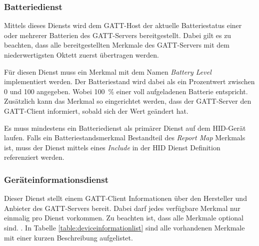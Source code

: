 \subsubsection{Batteriedienst}
Mittels dieses Diensts wird dem \acs{GATT}-Host der aktuelle Batteriestatus einer oder mehrerer Batterien des \acs{GATT}-Servers bereitgestellt. Dabei gilt es zu beachten, dass alle bereitgestellten Merkmale des \acs{GATT}-Servers mit dem niederwertigsten Oktett zuerst übertragen werden. \cite[S.~6]{bluetoothBatteryS}

Für diesen Dienst muss ein Merkmal mit dem Namen \textit{Battery Level} implementiert werden. Der Batteriestand wird dabei als ein Prozentwert zwischen 0 und 100 angegeben. Wobei 100~\% einer voll aufgeladenen Batterie entspricht. Zusätzlich kann das Merkmal so eingerichtet werden, dass der \acs{GATT}-Server den \acs{GATT}-Client informiert, sobald sich der Wert geändert hat. \cite[S.~8]{bluetoothBatteryS}

Es muss mindestens ein Batteriedienst als primärer Dienst auf dem \acs{HID}-Gerät laufen. Falls ein Batteriestandsmerkmal Bestandteil des \textit{Report Map} Merkmals ist, muss der Dienst mittels eines \textit{Include} in der \acs{HID} Dienst Definition referenziert werden. \cite[S.~14]{bluetoothHOGP}

\subsubsection{Geräteinformationsdienst}
Dieser Dienst stellt einem \acs{GATT}-Client Informationen über den Hersteller und Anbieter des \acs{GATT}-Servers bereit. Dabei darf jedes verfügbare Merkmal nur einmalig pro Dienst vorkommen. Zu beachten ist, dass alle Merkmale optional sind. \cite[S.~6ff.]{bluetoothDeviceI}. In Tabelle \ref{table:deviceinformationlist} sind alle vorhandenen Merkmale mit einer kurzen Beschreibung aufgelistet.

